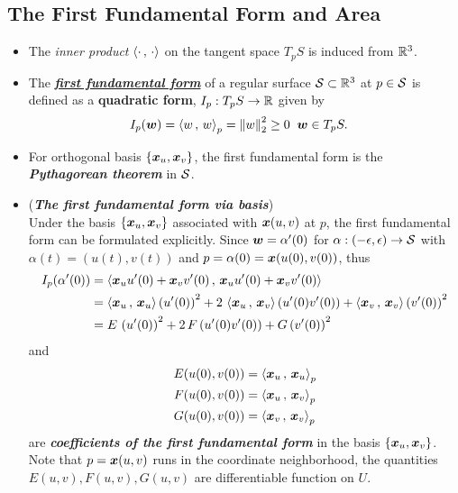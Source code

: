 \documentclass[11pt]{article}
\begin{document}
\subsection{The First Fundamental Form and Area}
\begin{itemize}
\item  The \emph{inner product} $\left\langle \cdot\,,\, \cdot \right\rangle$ on the tangent space $T_{p}S$ is induced from ${\mathbb R}^{3}$. 

\item \begin{definition}
 The \underline{\emph{\textbf{first fundamental form}}} of a regular surface ${\mathcal S}\subset {\mathbb R}^{3}$ at $p\in {\mathcal S}$ is defined as a  \textbf{quadratic form},  $I_{p}: T_{p}S \rightarrow {\mathbb R}$ given by 
\begin{align}
I_{p}(\boldsymbol{w}) &= \left\langle w\,,\, w \right\rangle_{p} = \left\|w\right\|_{2}^{2} \ge 0\; \; \boldsymbol{w}\in T_{p}S. \label{eqn: first_fund_form1}
\end{align}
\end{definition}

\item For orthogonal basis $\left\{\boldsymbol{x}_{u}, \boldsymbol{x}_{v}\right\}$, the first fundamental form is the \emph{\textbf{Pythagorean theorem}} in ${\mathcal S}$. 

\item (\emph{\textbf{The first fundamental form via basis}})\\
Under the basis $\left\{\boldsymbol{x}_{u}, \boldsymbol{x}_{v}\right\}$ associated with $\boldsymbol{x}(u,v)$ at $p$, the first fundamental form can be formulated explicitly. Since $\boldsymbol{w} = \alpha'(0)$ for $\alpha:  (-\epsilon, \epsilon) \rightarrow {\mathcal S}$ with $\alpha(t) = (u(t), v(t))$ and $p = \alpha(0) = \boldsymbol{x}(u(0), v(0))$, thus
\begin{align}
I_{p}(\alpha'(0)) &= \left\langle \boldsymbol{x}_{u}u'(0) + \boldsymbol{x}_{v}v'(0)\,,\, \boldsymbol{x}_{u}u'(0) + \boldsymbol{x}_{v}v'(0) \right\rangle \nonumber\\
&= \left\langle \boldsymbol{x}_{u}\,,\, \boldsymbol{x}_{u} \right\rangle\left(u'(0)\right)^{2} + 2\,\left\langle \boldsymbol{x}_{u}\,,\, \boldsymbol{x}_{v} \right\rangle\left(u'(0)v'(0)\right) +  \left\langle \boldsymbol{x}_{v}\,,\, \boldsymbol{x}_{v} \right\rangle\left(v'(0)\right)^{2}\nonumber\\
&= E\,\left(u'(0)\right)^{2} + 2\,F\left(u'(0)v'(0)\right) + G\left(v'(0)\right)^{2} \label{eqn: first_fund_form2}
\end{align}
and 
\begin{align}
E(u(0), v(0)) &= \left\langle \boldsymbol{x}_{u}\,,\, \boldsymbol{x}_{u} \right\rangle_{p}\nonumber\\
F(u(0), v(0)) &= \left\langle \boldsymbol{x}_{u}\,,\, \boldsymbol{x}_{v} \right\rangle_{p}\nonumber\\
G(u(0), v(0)) &= \left\langle \boldsymbol{x}_{v}\,,\, \boldsymbol{x}_{v} \right\rangle_{p} \label{eqn: first_fund_coeff}
\end{align} are \emph{\textbf{coefficients of the first fundamental form}} in the basis $\left\{\boldsymbol{x}_{u}, \boldsymbol{x}_{v}\right\}$. Note that $p=\boldsymbol{x}(u,v)$ runs in the coordinate neighborhood, the quantities $E(u,v), F(u,v), G(u,v)$ are differentiable function on $U$.


\end{itemize}
\end{document}
